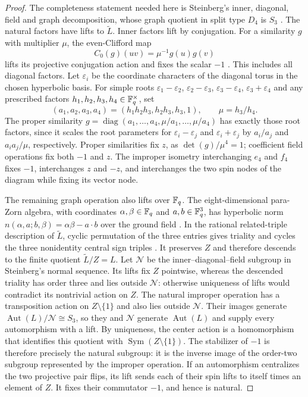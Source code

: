 \begin{proof}
The completeness statement needed here is Steinberg's inner, diagonal,
field and graph decomposition, whose graph quotient in split type $D_4$
is $S_3$ \cite[\S3, statements~3.2--3.6]{Steinberg1960}.
The natural factors have lifts to $\widetilde L$.  Inner factors lift by conjugation.
For a similarity $g$ with multiplier $\mu$, the even-Clifford map
\[
 C_0(g)(uv)=\mu^{-1}g(u)g(v)
\]
lifts its projective conjugation action and fixes the scalar $-1$
\cite[(4.1), p.~422]{CEKT2013}.
This includes all diagonal factors. Let $\varepsilon_i$ be the
coordinate characters of the diagonal torus in the chosen hyperbolic
basis. For simple roots
$\varepsilon_1-\varepsilon_2$, $\varepsilon_2-\varepsilon_3$,
$\varepsilon_3-\varepsilon_4$, $\varepsilon_3+\varepsilon_4$ and any
prescribed factors $h_1,h_2,h_3,h_4\in\mathbb F_q^\times$, set
\[
 (a_1,a_2,a_3,a_4)=(h_1h_2h_3,h_2h_3,h_3,1),\qquad
 \mu=h_3/h_4.
\]
The proper similarity
$g=\operatorname{diag}(a_1,\ldots,a_4,\mu/a_1,\ldots,\mu/a_4)$
has exactly those root factors, since it scales the root parameters
for $\varepsilon_i-\varepsilon_j$ and $\varepsilon_i+\varepsilon_j$
by $a_i/a_j$ and $a_i a_j/\mu$, respectively.
Proper similarities fix $z$, as $\det(g)/\mu^4=1$; coefficient field
operations fix both $-1$ and $z$.  The improper isometry interchanging
$e_4$ and $f_4$ fixes $-1$, interchanges $z$ and $-z$, and interchanges
the two spin nodes of the diagram while fixing its vector node.

The remaining graph operation also lifts over $\mathbb F_q$.
The eight-dimensional para-Zorn algebra, with coordinates
$\alpha,\beta\in\mathbb F_q$ and $a,b\in\mathbb F_q^3$, has hyperbolic norm
$n(\alpha,a;b,\beta)=\alpha\beta-a\cdot b$ over the ground field
\cite[\S5, pp.~425--426]{CEKT2013}.  In the rational related-triple
description of $\widetilde L$, cyclic permutation of the three entries gives
triality and cycles the three nonidentity central sign triples
\cite[Proposition 4.6 and the following center description, p.~424]{CEKT2013}.
It preserves $Z$ and therefore descends to the finite quotient $\widetilde L/Z=L$.
Let $\mathcal N$ be the inner--diagonal--field subgroup in Steinberg's normal
sequence.  Its lifts fix $Z$ pointwise, whereas the descended triality
has order three and lies outside $\mathcal N$: otherwise uniqueness of lifts
would contradict its nontrivial action on $Z$.
The natural improper operation has a transposition action on
$Z\setminus\{1\}$ and also lies outside $\mathcal N$.
Their images generate $\operatorname{Aut}(L)/\mathcal N\cong S_3$, so they and
$\mathcal N$ generate $\operatorname{Aut}(L)$ and supply every automorphism with
a lift.  By uniqueness, the center action is a homomorphism that
identifies this quotient with $\operatorname{Sym}(Z\setminus\{1\})$.
The stabilizer of $-1$ is therefore precisely the natural subgroup:
it is the inverse image of the order-two subgroup represented by the
improper operation.  If an automorphism centralizes the two projective
pair flips, its lift sends each of their spin lifts to itself times an
element of $Z$.  It fixes their commutator $-1$, and hence is natural.


\end{proof}
